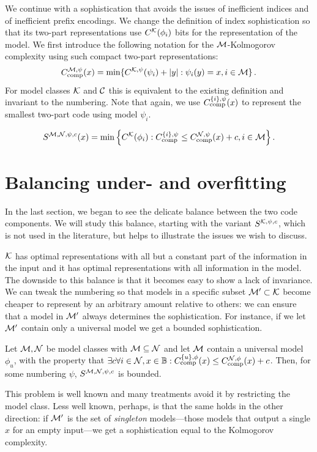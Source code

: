 We continue with a sophistication that avoids the issues of inefficient indices and of inefficient prefix encodings. We change the definition of index sophistication so that its two-part representations use $C^{\cal K}(\phi_i)$ bits for the representation of the model. We first introduce the following notation for the ${\cal M}$-Kolmogorov complexity using such compact two-part representations:
\[
C_{\textnormal{comp}}^{{\cal M}, \psi}(x) = \min\{ C^{{\cal K}, \psi}(\psi_i) + |y| :  \psi_i(y) = x, i \in {\cal M}\}\,\text{.}
\]
For model classes ${\cal K}$ and ${\cal C}$ this is equivalent to the existing definition and invariant to the numbering. Note that again, we use $C_{\textnormal{comp}}^{\{i\}, \psi}(x)$ to represent the smallest two-part code using model $\psi_i$.

\begin{definition}[Sophistication]
\[
S^{{\cal M},{\cal N},\psi,c}(x)=\min\left\{C^{\cal K}(\phi_i): C_{\textnormal{comp}}^{\{i\}, \psi} \le C_{\textnormal{comp}}^{{\cal N},\psi}(x)+c, i\in{\cal M}\right\}.
\]
\end{definition}

\section{Balancing under- and overfitting}
\label{section:balance}

In the last section, we began to see the delicate balance between the two code components. We will study this balance, starting with the variant $S^{{\cal K},\psi,c}$, which is not used in the literature, but helps to illustrate the issues we wish to discuss.

${\cal K}$ has optimal representations with all but a constant part of the information in the input and it has optimal representations with all information in the model. The downside to this balance is that it becomes easy to show a lack of invariance. We can tweak the numbering so that models in a specific subset ${\cal M}'\subset{\cal K}$ become cheaper to represent by an arbitrary amount relative to others: we can ensure that a model in ${\cal M}'$ always determines the sophistication. For instance, if we let ${\cal M}'$ contain only a universal model we get a bounded sophistication.

\begin{theorem}[Underfitting]
Let ${\cal M}, {\cal N}$ be model classes with ${\cal M} \subseteq {\cal N}$ and let ${\cal M}$ contain a universal model $\phi_u$, with the property that $\exists c \forall i \in {\cal N}, x \in {\mathbb B} : C_{\textnormal{comp}}^{\{u\},\phi}(x) \leq C_{\textnormal{comp}}^{{\cal N}, \phi}(x)+ c$. Then, for some numbering $\psi$, $S^{{\cal M},{\cal N}, \psi,c}$ is bounded. \label{theorem:underfitting}
\end{theorem}
This problem is well known and many treatments avoid it by restricting the model class. Less well known, perhaps, is that the same holds in the other direction:  if ${\cal M}'$ is the set of \emph{singleton} models---those models that output a single $x$ for an empty input---we get a sophistication equal to the Kolmogorov complexity.

